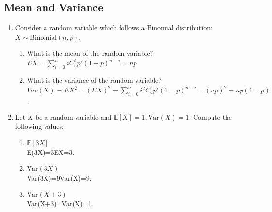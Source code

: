 \documentclass[a4paper]{article}
\theoremstyle{definition}
\newcommand{\Var}{\mathrm{Var}}
\newenvironment{soln}{
    \leavevmode\color{blue}\ignorespaces
}{}
\begin{document}
\subsection{Mean and Variance}
\begin{enumerate}
\item Consider a random variable which follows a Binomial
  distribution: $X \sim \text{Binomial}(n, p)$.
  \begin{enumerate}
  \item What is the mean of the random variable?\\
    \begin{soln}  $EX=\sum\limits_{i=0}^niC_n^ip^i(1-p)^{n-i}=np$ \end{soln}
  \item What is the variance of the random variable?\\
    \begin{soln}   $Var(X)=EX^2-(EX)^2=\sum\limits_{i=0}^ni^2C_n^ip^i(1-p)^{n-i}-(np)^2=np(1-p)$. \end{soln}
  \end{enumerate}

\item Let $X$ be a random variable and
  $\mathbb{E}[X] = 1, \Var(X) = 1$. Compute the following values:
  \begin{enumerate}
  \item $\mathbb{E}[3X]$\\
    \begin{soln}  E(3X)=3EX=3. \end{soln}
  \item $\Var(3X)$\\
    \begin{soln}  Var(3X)=9Var(X)=9. \end{soln}
  \item $\Var(X+3)$\\
    \begin{soln}  Var(X+3)=Var(X)=1. \end{soln}
  \end{enumerate}
\end{enumerate}

\end{document}
